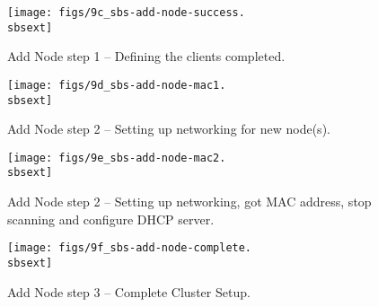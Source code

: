 \begin{figure}[htbp]
  \begin{center}
    \centerline{\texttt{[image: figs/9c\_sbs-add-node-success.\\sbsext]}}
    \caption{Add Node step 1 -- Defining the clients completed.}
    \label{fig:sbs-add-node1-define-clients2}
  \end{center}
\end{figure}

\begin{figure}[htbp]
  \begin{center}
    \centerline{\texttt{[image: figs/9d\_sbs-add-node-mac1.\\sbsext]}}
    \caption{Add Node step 2 -- Setting up networking for new node(s).}
    \label{fig:sbs-add-node1-setup-network}
  \end{center}
\end{figure}

\begin{figure}[htbp]
  \begin{center}
    \centerline{\texttt{[image: figs/9e\_sbs-add-node-mac2.\\sbsext]}}
    \caption[Add Node step 2 -- Setting up networking, further
    progress]{Add Node step 2 -- Setting up networking, got MAC
      address, stop scanning and configure DHCP server.}
    \label{fig:sbs-add-node1-setup-network2}
  \end{center}
\end{figure}

\begin{figure}[htbp]
  \begin{center}
    \centerline{\texttt{[image: figs/9f\_sbs-add-node-complete.\\sbsext]}}
    \caption{Add Node step 3 -- Complete Cluster Setup.}
    \label{fig:sbs-add-node1-cluster-setup}
  \end{center}
\end{figure}

\clearpage

